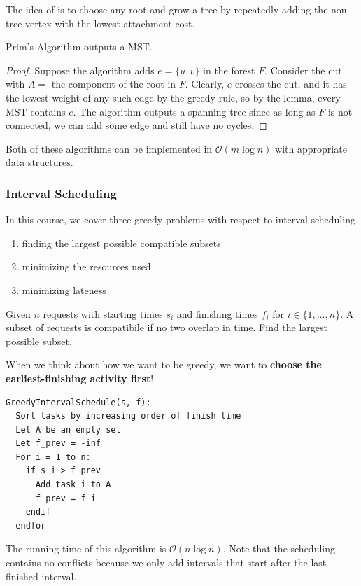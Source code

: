 \documentclass[12pt]{scrartcl}
\begin{document}
\begin{definition}
  The idea of  is to choose any root and grow a tree by repeatedly adding the non-tree
  vertex with the lowest attachment cost. 
\end{definition}

\begin{theorem}
  Prim's Algorithm outputs a MST.
  \begin{proof}
    Suppose the algorithm adds $e = \{u, v\}$ in the forest $F$. Consider the cut with $A = $ the component of the 
    root in $F$. Clearly, $e$ crosses the cut, and it has the lowest weight of any such edge by the greedy rule, so by the 
    lemma, every MST contains $e$. The algorithm outputs a spanning tree since as long as $F$ is not connected, 
    we can add some edge and still have no cycles. 
  \end{proof}
\end{theorem}

\begin{note}
  Both of these algorithms can be implemented in $\mathcal{O}(m \log n)$ with appropriate 
  data structures. 
\end{note}

\subsubsection{Interval Scheduling}
In this course, we cover three greedy problems with respect to interval scheduling
\begin{enumerate}
  \item finding the largest possible compatible subsets
  \item minimizing the resources used
  \item minimizing lateness
\end{enumerate}

Given $n$ requests with starting times $s_i$ and finishing times $f_i$ for $i \in \{1, \ldots, n\}$. 
A subset of requests is compatibile if no two overlap in time. Find the largest possible subset.

\begin{note}
  When we think about how we want to be greedy, we want to \textbf{choose the earliest-finishing activity first}!
\begin{lstlisting}
GreedyIntervalSchedule(s, f):
  Sort tasks by increasing order of finish time
  Let A be an empty set
  Let f_prev = -inf
  For i = 1 to n:
    if s_i > f_prev 
      Add task i to A
      f_prev = f_i
    endif
  endfor
\end{lstlisting}
The running time of this algorithm is $\mathcal{O}(n \log n)$. Note that the scheduling contains 
no conflicts because we only add intervals that start after the last finished interval. 
\end{note}
\end{document}
